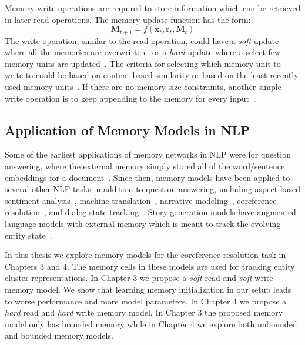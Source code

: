 \documentclass[12pt]{thesis-umich}[thesis]
\def\vec#1{\ensuremath{\boldsymbol{{#1}}}}
\begin{document}
Memory write operations are required to store information which can be retrieved in later read operations. The memory update function has the form: 
$$\vec{M}_{t+1} = f(\vec{x}_t, \vec{r}_t, \vec{M}_{t})$$
The write operation, similar to the read operation, could have a \emph{soft} update where all the memories are overwritten~\cite{graves2014neural, graves2016hybrid, liu2019referential, henaff2016tracking} or a \emph{hard} update where a select few memory units are updated~\cite{rae2016scaling}. The criteria for selecting which memory unit to write to could be based on content-based similarity or based on the least recently used memory units~\cite{rae2016scaling}. If there are no memory size constraints, another simple write operation is to keep appending to the memory for every input~\cite{weston2014memory}.    









\subsection{Application of Memory Models in NLP}


Some of the earliest applications of memory networks in NLP were for question answering, where the external memory simply stored all of the word/sentence embeddings for a document~\cite{weston2014memory, sukhbaatar-15, kumar2016ask, miller-etal-2016-key, henaff2016tracking}. 
Since then, memory models have been applied to several other NLP tasks in addition to question answering, including aspect-based sentiment analysis~\citep{liu-etal-2018-recurrent}, machine translation~\citep{maruf-haffari-2018-document}, narrative modeling~\citep{liu-etal-2018-narrative}, coreference resolution~\cite{liu2019referential}, and dialog state tracking~\citep{perez-liu-2017-dialog}. 
Story generation models have augmented language models with external memory which is meant to track the evolving entity state~\cite{clark-etal-2018-neural, rashkin-etal-2020-plotmachines}. 

In this thesis we explore memory models for the coreference resolution task in Chapters 3 and 4. 
The memory cells in these models are used for tracking entity cluster representations. 
In Chapter 3 we propose a \emph{soft} read and \emph{soft} write memory model. 
We show that learning memory initialization in our setup leads to worse performance and more model parameters.   
In Chapter 4 we propose a \emph{hard} read and \emph{hard} write memory model. In Chapter 3 the proposed memory model only has bounded memory while in Chapter 4 we explore both unbounded and bounded memory models.  
\end{document}
